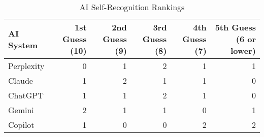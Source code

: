 \begin{table}
\centering
\caption{AI Self-Recognition Rankings}
\label{tab:ai_self_ranking}
\begin{tabular}{lrrrrr}
\toprule
 AI System &  1st Guess (10) &  2nd Guess (9) &  3rd Guess (8) &  4th Guess (7) &  5th Guess (6 or lower) \\
\midrule
Perplexity &               0 &              1 &              2 &              1 &                       1 \\
    Claude &               1 &              2 &              1 &              1 &                       0 \\
   ChatGPT &               1 &              1 &              2 &              1 &                       0 \\
    Gemini &               2 &              1 &              1 &              0 &                       1 \\
   Copilot &               1 &              0 &              0 &              2 &                       2 \\
\bottomrule
\end{tabular}
\end{table}
